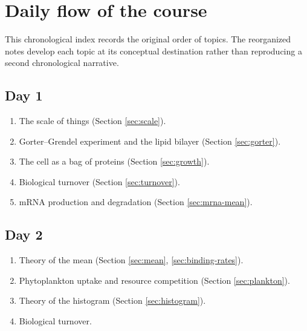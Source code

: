 \clearpage
\section{Daily flow of the course}
\label{app:daily}
This chronological index records the original order of topics.
The reorganized notes develop each topic at its conceptual destination rather than reproducing a second chronological narrative.
\subsection{Day 1}
\begin{enumerate}
    \item The scale of things (Section \ref{sec:scale}).
    \item Gorter--Grendel experiment and the lipid bilayer (Section \ref{sec:gorter}).
    \item The cell as a bag of proteins (Section \ref{sec:growth}).
    \item Biological turnover (Section \ref{sec:turnover}).
    \item mRNA production and degradation (Section \ref{sec:mrna-mean}).
\end{enumerate}
\subsection{Day 2}
\begin{enumerate}
    \item Theory of the mean (Section \ref{sec:mean}, \ref{sec:binding-rates}).
    \item Phytoplankton uptake and resource competition (Section \ref{sec:plankton}).
    \item Theory of the histogram (Section \ref{sec:histogram}).
    \item Biological turnover.
\end{enumerate}
